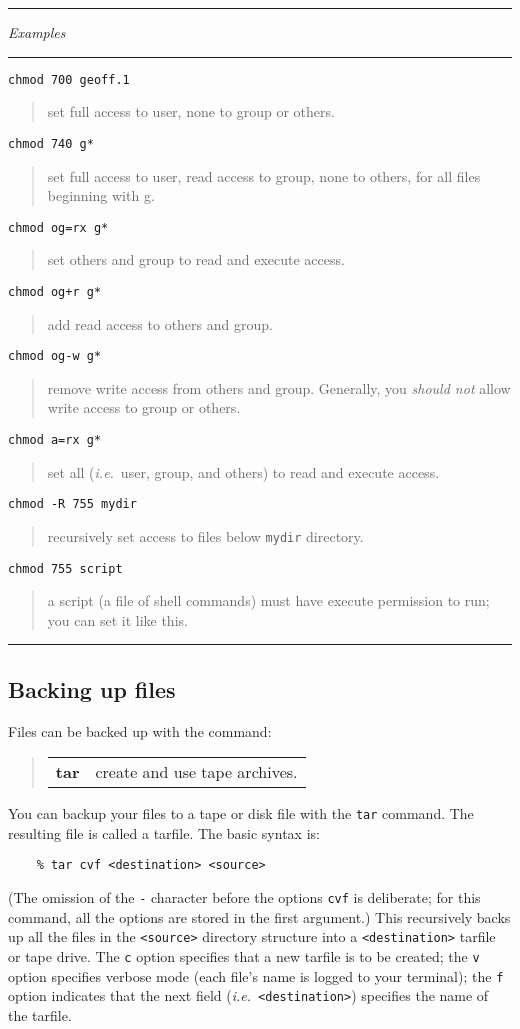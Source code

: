 \documentclass[twoside,11pt]{article}
\newcommand{\example}[2]{\goodbreak
                         {\tt #1}
                         \vspace*{-4mm}
                         \begin{quote}
                           {\small #2}
                         \end{quote}
                        }
\newcommand{\example}[2]{\goodbreak
                            {\tt #1}
                            \vspace*{-4mm}
                            \begin{quote}
                            {#2}
                            \end{quote}
                           }
\newcommand{\exbegin}{\begin{center}
                      \rule{18mm}{0.3mm}
                      {\em Examples}
                      \rule{18mm}{0.3mm}
                      \end{center}
                     }
\newcommand{\exend}{\begin{center}
                    \rule{50mm}{0.3mm}
                    \end{center}
                   }
\begin{document}
\goodbreak

\exbegin

\example{chmod 700 geoff.1}
{set full access to user, none to group or others.}

\example{chmod 740 g*}
{set full access to user, read access to group, none to others, for all files
beginning with g.}

\example{chmod og=rx g*}
{set others and group to read and execute access.}

\example{chmod og+r g*}
{add read access to others and group.}

\example{chmod og-w g*}
{remove write access from others and group. Generally, you {\em should not\/}
allow write access to group or others.}

\example{chmod a=rx g*}
{set all ({\em i.e.}\ user, group, and others) to read and execute access.}

\example{chmod -R 755 mydir}
{recursively set access to files below {\tt mydir} directory.}

\example{chmod 755 script}
{a script (a file of shell commands) must have execute permission to run; you
can set it like this.}

\exend

\subsection{Backing up files}

Files can be backed up with the command:
\begin{quote}
\begin{tabular}{lp{72mm}}

{\bf tar}  & create and use tape archives.

\end{tabular}
\end{quote}
You can backup your files to a tape or disk file with the {\tt tar} command.
The resulting file is called a tarfile.
The basic syntax is:
\begin{verbatim}
    % tar cvf <destination> <source>
\end{verbatim}
(The omission of the {\tt -} character before the options {\tt cvf} is
deliberate; for this command, all the options are stored in the first argument.)
This recursively backs up all the files in the {\tt <source>} directory
structure into a {\tt <destination>} tarfile or tape drive.
The {\tt c} option specifies that a new tarfile is to be created;
the {\tt v} option specifies verbose mode (each file's name is logged to your
terminal);
the {\tt f} option indicates that the next field
({\em i.e.}\ {\tt <destination>}) specifies the name of the tarfile.
\end{document}

